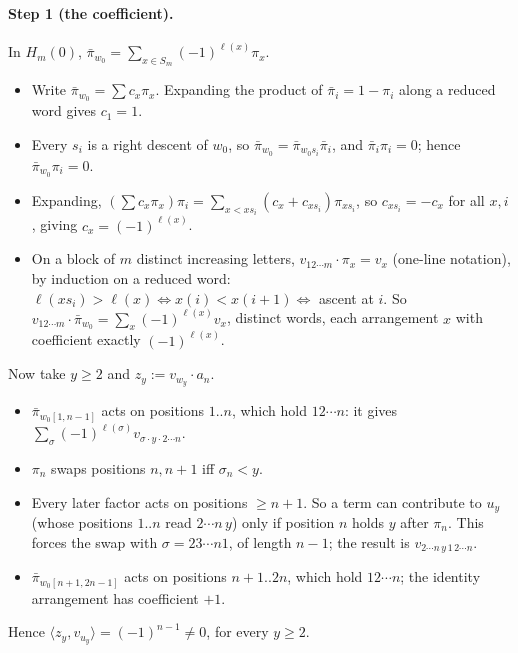 \documentclass[11pt]{amsart}
\newcommand{\pb}{\bar\pi}
\newcommand{\wo}{w_0}
\theoremstyle{plain}
\theoremstyle{definition}
\begin{document}
\paragraph{Step 1 (the coefficient).} In $H_m(0)$, $\pb_{\wo}=\sum_{x\in S_m}(-1)^{\ell(x)}\pi_x$.
\begin{itemize}[leftmargin=1.2em,itemsep=1pt]
\item Write $\pb_{\wo}=\sum c_x\pi_x$. Expanding the product of $\pb_i=1-\pi_i$ along a reduced word gives $c_1=1$.
\item Every $s_i$ is a right descent of $\wo$, so $\pb_{\wo}=\pb_{\wo s_i}\pb_i$, and $\pb_i\pi_i=0$; hence $\pb_{\wo}\pi_i=0$.
\item Expanding, $(\sum c_x\pi_x)\pi_i=\sum_{x<xs_i}(c_x+c_{xs_i})\pi_{xs_i}$, so $c_{xs_i}=-c_x$ for all $x,i$, giving $c_x=(-1)^{\ell(x)}$.
\item On a block of $m$ distinct increasing letters, $v_{12\cdots m}\cdot\pi_x=v_x$ (one-line notation), by induction on a reduced word: $\ell(xs_i)>\ell(x)\iff x(i)<x(i+1)\iff$ ascent at $i$. So $v_{12\cdots m}\cdot\pb_{\wo}=\sum_x(-1)^{\ell(x)}v_x$, distinct words, each arrangement $x$ with coefficient exactly $(-1)^{\ell(x)}$.
\end{itemize}
Now take $y\ge2$ and $z_y:=v_{w_y}\cdot a_n$.
\begin{itemize}[leftmargin=1.2em,itemsep=1pt]
\item $\pb_{\wo[1,n-1]}$ acts on positions $1..n$, which hold $12\cdots n$: it gives $\sum_\sigma(-1)^{\ell(\sigma)}v_{\sigma\cdot y\cdot2\cdots n}$.
\item $\pi_n$ swaps positions $n,n+1$ iff $\sigma_n<y$.
\item Every later factor acts on positions $\ge n+1$. So a term can contribute to $u_y$ (whose positions $1..n$ read $2\cdots n\,y$) only if position $n$ holds $y$ after $\pi_n$. This forces the swap with $\sigma=23\cdots n1$, of length $n-1$; the result is $v_{2\cdots n\,y\,1\,2\cdots n}$.
\item $\pb_{\wo[n+1,2n-1]}$ acts on positions $n+1..2n$, which hold $12\cdots n$; the identity arrangement has coefficient $+1$.
\end{itemize}
Hence $\langle z_y,v_{u_y}\rangle=(-1)^{n-1}\neq0$, for every $y\ge2$.
\end{document}
